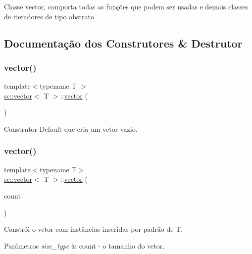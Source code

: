 Classe vector, comporta todas as funções que podem ser usadas e demais classes de iteradores de tipo abstrato 

\subsection{Documentação dos Construtores \& Destrutor}
\mbox{\label{classsc_1_1vector_a8bdd977a270969ddd857da2bb43bd3ca}} 
\subsubsection{\texorpdfstring{vector()}{vector()}\hspace{0.1cm}{\footnotesize\ttfamily [1/11]}}
{\footnotesize\ttfamily template$<$typename T $>$ \\
\mbox{\hyperlink{classsc_1_1vector}{sc\+::vector}}$<$ T $>$\+::\mbox{\hyperlink{classsc_1_1vector}{vector}} (\begin{DoxyParamCaption}\item[{void}]{ }\end{DoxyParamCaption})}

Construtor Default que cria um vetor vazio. \mbox{\label{classsc_1_1vector_a641fcc38459aee8e3bdf86abb5f9d193}} 
\subsubsection{\texorpdfstring{vector()}{vector()}\hspace{0.1cm}{\footnotesize\ttfamily [2/11]}}
{\footnotesize\ttfamily template$<$typename T$>$ \\
\mbox{\hyperlink{classsc_1_1vector}{sc\+::vector}}$<$ T $>$\+::\mbox{\hyperlink{classsc_1_1vector}{vector}} (\begin{DoxyParamCaption}\item[{size\+\_\+type}]{count }\end{DoxyParamCaption})}

Constrói o vetor com instâncias inseridas por padrão de T. 
\begin{DoxyParams}{Parâmetros}
{\em size\+\_\+type} & count -\/ o tamanho do vetor. \\
\hline
\end{DoxyParams}
\mbox{\label{classsc_1_1vector_ab58c55200c6a120b9d24793a271512fb}} 
